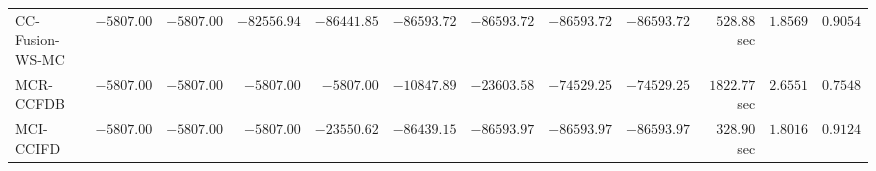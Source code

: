 \begin{table}[H]
\begin{tabular}{lrrrrrrrrrrr}
     CC-Fusion-WS-MC & $     -5807.00$ & $     -5807.00$ & $    -82556.94$ & $    -86441.85$ & $    -86593.72$ & $    -86593.72$ & $    -86593.72$ & $    -86593.72$ & $       528.88$ sec    & $       1.8569$  & $       0.9054$ \\ 
\cmidrule{1-1} 
           MCR-CCFDB & $     -5807.00$ & $     -5807.00$ & $     -5807.00$ & $     -5807.00$ & $    -10847.89$ & $    -23603.58$ & $    -74529.25$ & $    -74529.25$ & $      1822.77$ sec    & $       2.6551$  & $       0.7548$ \\ 
\cmidrule{1-1} 
           MCI-CCIFD & $     -5807.00$ & $     -5807.00$ & $     -5807.00$ & $    -23550.62$ & $    -86439.15$ & $    -86593.97$ & $    -86593.97$ & $    -86593.97$ & $       328.90$ sec    & $       1.8016$  & $       0.9124$ \\ 
\bottomrule
\end{tabular}
\end{table}

